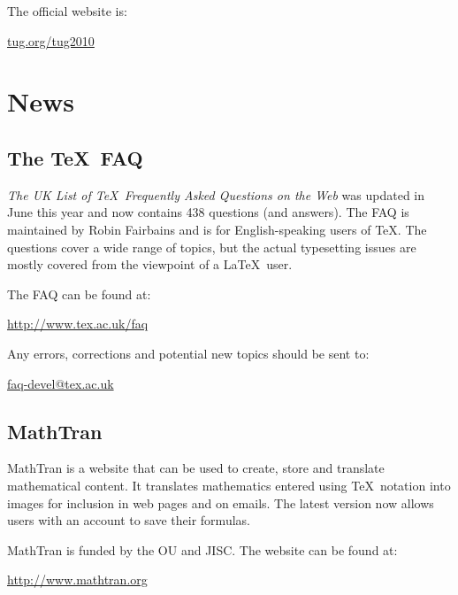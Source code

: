 \documentclass[a4paper,twoside,twocolumn]{article}
\begin{document}
The official website is:
\begin{center}
 \href{http://tug.org/tug2010/}{tug.org/tug2010}
\end{center}


\section{News}
\subsection{The \TeX\ FAQ}
\emph{The UK List of \TeX\ Frequently Asked Questions on the Web} was updated in June this year and now contains 438 questions (and answers). The FAQ is maintained by Robin Fairbains and is for English-speaking users of \TeX. The questions cover a wide range of topics, but the actual typesetting issues are mostly covered from the viewpoint of a \LaTeX\ user. 

The FAQ can be found at:
\begin{center}
\href{http://www.tex.ac.uk/faq}{http://www.tex.ac.uk/faq}
\end{center}

Any errors, corrections and potential new topics should be sent to:
\begin{center}
\href{mailto:faq-devel@tex.ac.uk}{faq-devel@tex.ac.uk}
\end{center}


\subsection{MathTran}

MathTran is a website that can be used to create, store and translate mathematical content. It translates mathematics entered using \TeX\ notation into images for inclusion in web pages and on emails. The latest version now allows users with an account to save their formulas.

MathTran is funded by the OU and JISC. The website can be found at:
\begin{center}
\href{http://www.mathtran.org/}{http://www.mathtran.org}
\end{center}



\end{document}
